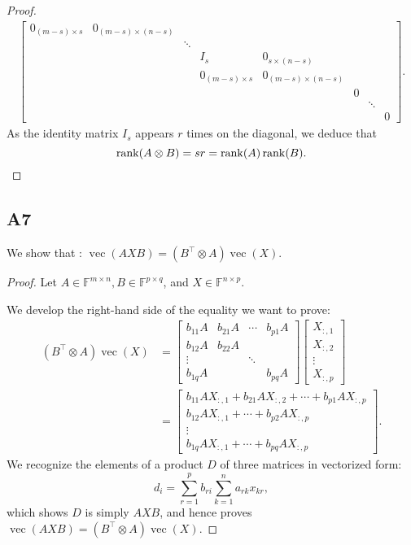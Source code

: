 \documentclass[11pt]{article}
\DeclareMathOperator{\rank}{rank}
\DeclareMathOperator{\vect}{vec}
\newcommand{\field}{\mathbb{F}} %
\newcommand{\kp}{\otimes} %
\begin{document}
\begin{proof}
\begin{align*}
\begin{bmatrix}
    0_{(m-s) \times s} & 0_{(m-s) \times (n-s)} & & & & &\\
    & & \ddots & & & &\\
    & & & I_s & 0_{s \times (n - s)} & & &\\
    & & & 0_{(m-s) \times s} & 0_{(m-s) \times (n-s)} & & &\\
    & & & & & 0 & &\\
    & & & & & & \ddots &\\
    & & & & & & & 0 
    \end{bmatrix}.
\end{align*}
As the identity matrix $I_s$ appears \(r\) times on the diagonal, we deduce that
\[
    \rank(A\kp B)=sr=\rank(A)\rank(B).\qedhere
\]
\end{proof}

\subsection*{A7}
We show that : $\vect(AXB)=(B^\top\kp A)\vect(X)$.
\begin{proof}
Let \(A \in \field^{m\times n}, B \in \field^{p\times q}\), and \(X \in \field^{n\times p}\).

We develop the right-hand side of the equality we want to prove:
\begin{align*}
    (B^\top\kp A)\vect(X) &=
    \begin{bmatrix}
    b_{11}A & b_{21}A & \cdots & b_{p1}A\\
    b_{12}A & b_{22}A & & \\
    \vdots & & \ddots & \\
    b_{1q}A & & & b_{pq}A
    \end{bmatrix}
    \begin{bmatrix}
    X_{:,1}\\
    X_{:,2}\\
    \vdots\\
    X_{:,p}
    \end{bmatrix}\\
    &=
    \begin{bmatrix}
    b_{11}AX_{:,1} + b_{21}AX_{:,2} + \cdots + b_{p1}AX_{:,p}\\
    b_{12}AX_{:,1} + \cdots + b_{p2}AX_{:,p}\\
    \vdots \\
    b_{1q}AX_{:,1} + \cdots + b_{pq}AX_{:,p}
    \end{bmatrix}.
\end{align*}
We recognize the elements of a product \(D\) of three matrices in vectorized form:
\[
    d_i=\sum^{p}_{r=1}b_{ri}\sum^{n}_{k=1}a_{rk}x_{kr},
\]
which shows \(D\) is simply \(AXB\), and hence proves \(\vect(AXB)=(B^\top\kp A)\vect(X)\).
\end{proof}
\end{document}
